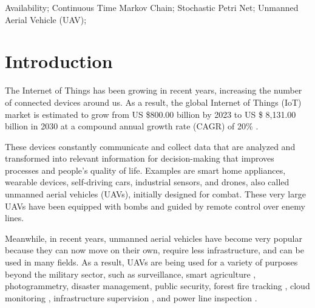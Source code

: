 \documentclass[conference]{IEEEtran}
\begin{document}
\begin{IEEEkeywords}
Availability; Continuous Time Markov Chain; Stochastic Petri Net; Unmanned Aerial Vehicle (UAV);
\end{IEEEkeywords}

\section{Introduction}
\label{sec:introduction}

The Internet of Things has been growing in recent years, increasing the number of connected devices around us. As a result, the global Internet of Things (IoT) market is estimated to grow from US \$800.00 billion by 2023 to US \$ 8,131.00 billion in 2030 at a compound annual growth rate (CAGR) of 20\% \citep{al2020internet}.

These devices constantly communicate and collect data that are analyzed and transformed into relevant information for decision-making that improves processes and people's quality of life. Examples are smart home appliances, wearable devices, self-driving cars, industrial sensors, and drones, also called unmanned aerial vehicles (UAVs), initially designed for combat. These very large UAVs have been equipped with bombs and guided by remote control over enemy lines.

Meanwhile, in recent years, unmanned aerial vehicles have become very popular because they can now move on their own, require less infrastructure, and can be used in many fields. As a result, UAVs are being used for a variety of purposes beyond the military sector, such as surveillance\citep{basilico2015deploying}, smart agriculture \citep{lottes2017uav}, photogrammetry\citep{cesetti2011visual}, disaster management, public security\citep {maza2011experimental}, forest fire tracking \citep{pham2017distributed}, cloud monitoring \citep{renzaglia2016monitoring}, infrastructure supervision \citep{guerrero2013uav}, and power line inspection \citep{chang2017development}.

\end{document}
